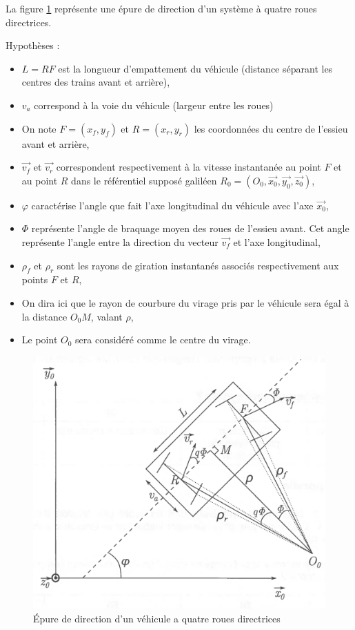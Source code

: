 La figure \ref{fig08} représente une épure de direction d'un système à quatre roues directrices.

Hypothèses :
\begin{itemize}
 \item $L=RF$ est la longueur d'empattement du véhicule (distance séparant les centres des trains avant et arrière),
 \item $v_a$ correspond à la voie du véhicule (largeur entre les roues)
 \item On note $F=(x_f,y_f)$ et $R=(x_r,y_r)$ les coordonnées du centre de l'essieu avant et arrière,
\item $\overrightarrow{v_f}$ et $\overrightarrow{v_r}$ correspondent respectivement à la vitesse instantanée au point $F$ et au point $R$ dans le référentiel supposé galiléen $R_0=(O_0,\overrightarrow{x_0},\overrightarrow{y_0},\overrightarrow{z_0})$,
 \item $\varphi$ caractérise l'angle que fait l'axe longitudinal du véhicule avec l'axe $\overrightarrow{x_0}$,
 \item $\Phi$ représente l'angle de braquage moyen des roues de l'essieu avant. Cet angle représente l'angle entre la direction du vecteur $\overrightarrow{v_f}$ et l'axe longitudinal,
 \item $\rho_f$ et $\rho_r$ sont les rayons de giration instantanés associés respectivement aux points $F$ et $R$,
 \item On dira ici que le rayon de courbure du virage pris par le véhicule sera égal à la distance $O_0M$, valant $\rho$,
 \item Le point $O_0$ sera considéré comme le centre du virage.
\end{itemize}

\begin{figure}[ht!]
\begin{center}
 \includegraphics[width=0.6\linewidth]{img/fig09}
\end{center}
\caption{Épure de direction d'un véhicule a quatre roues directrices}
\label{fig08}
\end{figure}

